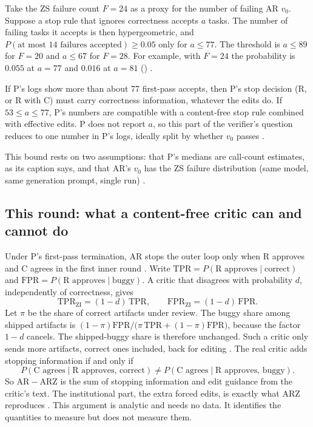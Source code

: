 \documentclass{article}
\begin{document}
Take the ZS failure count \(F=24\) as a proxy for the number of failing AR \(v_0\). Suppose a stop rule that ignores correctness accepts \(a\) tasks. The number of failing tasks it accepts is then hypergeometric, and \(P(\text{at most 14 failures accepted})\ge 0.05\) only for \(a\le 77\). The threshold is \(a\le 89\) for \(F=20\) and \(a\le 67\) for \(F=28\). For example, with \(F=24\) the probability is \(0.055\) at \(a=77\) and \(0.016\) at \(a=81\) () .

\begin{claim}
If P's logs show more than about 77 first-pass accepts, then P's stop decision (R, or R with C) must carry correctness information, whatever the edits do. If \(53\le a\le 77\), P's numbers are compatible with a content-free stop rule combined with effective edits. P does not report \(a\), so this part of the verifier's question reduces to one number in P's logs, ideally split by whether \(v_0\) passes .
\end{claim}

This bound rests on two assumptions: that P's medians are call-count estimates, as its caption says, and that AR's \(v_0\) has the ZS failure distribution (same model, same generation prompt, single run) .

\subsection{This round: what a content-free critic can and cannot do}
Under P's first-pass termination, AR stops the outer loop only when R approves and C agrees in the first inner round . Write \(\mathrm{TPR}=P(\text{R approves}\mid\text{correct})\) and \(\mathrm{FPR}=P(\text{R approves}\mid\text{buggy})\). A critic that disagrees with probability \(d\), independently of correctness, gives
\[
  \mathrm{TPR}_{\mathrm{ZI}}=(1-d)\,\mathrm{TPR},\qquad \mathrm{FPR}_{\mathrm{ZI}}=(1-d)\,\mathrm{FPR}.
\]
Let \(\pi\) be the share of correct artifacts under review. The buggy share among shipped artifacts is \((1-\pi)\mathrm{FPR}/\bigl(\pi\,\mathrm{TPR}+(1-\pi)\mathrm{FPR}\bigr)\), because the factor \(1-d\) cancels. The shipped-buggy share is therefore unchanged. Such a critic only sends more artifacts, correct ones included, back for editing . The real critic adds stopping information if and only if
\[
  P(\text{C agrees}\mid\text{R approves, correct}) \ne P(\text{C agrees}\mid\text{R approves, buggy}).
\]
So \(\mathrm{AR}-\mathrm{ARZ}\) is the sum of stopping information and edit guidance from the critic's text. The institutional part, the extra forced edits, is exactly what ARZ reproduces . This argument is analytic and needs no data. It identifies the quantities to measure but does not measure them.
\end{document}

